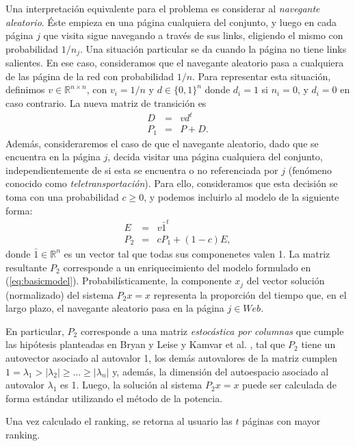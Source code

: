 \documentclass[11pt, a4paper]{article}
\begin{document}
Una interpretaci\'on equivalente para el problema es considerar al \emph{navegante aleatorio}. \'Este empieza en una
p\'agina cualquiera del conjunto, y luego en cada p\'agina $j$ que visita sigue navegando a trav\'es de sus links,
eligiendo el mismo con probabilidad $1/n_j$. Una situaci\'on particular se da cuando la p\'agina no tiene links salientes. En
ese caso, consideramos que el navegante aleatorio pasa a cualquiera de las p\'agina de la red con probabilidad $1/n$.
Para representar esta situaci\'on, definimos $v \in \mathbb{R}^{n \times n}$, con $v_i = 1/n$ y $d \in \{0,1\}^{n}$ donde 
$d_i = 1$ si $n_i = 0$, y $d_i = 0$ en caso contrario. La nueva matriz de transici\'on es 
\begin{eqnarray*}
D & = & v d^t \\
P_1 & = & P + D.
\end{eqnarray*}
Adem\'as, consideraremos el caso de que el navegante aleatorio, dado que se encuentra en la p\'agina $j$, decida visitar
una p\'agina cualquiera del conjunto, independientemente de si esta se encuentra o no referenciada por $j$ (fen\'omeno
conocido como \emph{teletransportaci\'on}). Para ello, consideramos que esta decisi\'on se toma con una probabilidad
$c \ge 0$, y podemos incluirlo al modelo de la siguiente forma:
\begin{eqnarray*}
E & = & v \bar{1}^t \\
P_2 & = & cP_1 + (1-c)E,
\end{eqnarray*}
\noindent donde $\bar{1} \in \mathbb{R}^n$ es un vector tal que todas sus componenetes valen 1. La matriz resultante
$P_2$ corresponde a un enriquecimiento del modelo formulado en (\ref{eq:basicmodel}). Probabil\'isticamente, la
componente $x_j$ del vector soluci\'on (normalizado) del sistema $P_2 x = x$ representa la proporci\'on del tiempo que,
en el largo plazo, el navegante aleatorio pasa en la p\'agina $j \in Web$.

En particular, $P_2$ corresponde a una
matriz \emph{estoc\'astica por columnas} que cumple las hip\'otesis planteadas en Bryan y Leise \cite{Bryan2006} y
Kamvar et al. \cite{Kamvar2003}, tal que $P_2$ tiene un autovector asociado al autovalor 1, los dem\'as autovalores de
la matriz cumplen $1 = \lambda_1 > |\lambda_2| \ge \dots \ge |\lambda_n|$ y, adem\'as, la dimensi\'on
del autoespacio asociado al autovalor $\lambda_1$ es 1. Luego, la soluci\'on al sistema $P_2 x = x$ puede ser calculada
de forma est\'andar utilizando el m\'etodo de la potencia.

Una vez calculado el ranking, se retorna al usuario las $t$ p\'aginas con mayor ranking.
\end{document}
